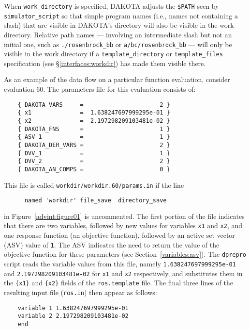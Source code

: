 When \texttt{work\_directory} is specified, DAKOTA adjusts the \texttt{\$PATH} seen
by \texttt{simulator\_script} so that simple program names
(i.e., names not containing a slash) that
are visible in DAKOTA's directory will also be visible in the work directory.
Relative path names ---
involving an intermediate slash but not an initial one,
such as \texttt{./rosenbrock\_bb} or \texttt{a/bc/rosenbrock\_bb} ---
will only be visible in the work directory if a \texttt{template\_directory}
or \texttt{template\_files} specification (see \S\ref{interfaces:workdir})
has made them visible there.

As an example of the data flow on a particular function evaluation,
consider evaluation 60. The parameters file for this evaluation consists of:
\begin{small}
\begin{verbatim}
    { DAKOTA_VARS     =                      2 }
    { x1              =  1.638247697999295e-01 }
    { x2              =  2.197298209103481e-02 }
    { DAKOTA_FNS      =                      1 }
    { ASV_1           =                      1 }
    { DAKOTA_DER_VARS =                      2 }
    { DVV_1           =                      1 }
    { DVV_2           =                      2 }
    { DAKOTA_AN_COMPS =                      0 }
\end{verbatim}
\end{small}

This file is called \texttt{workdir/workdir.60/params.in} if the line
\begin{small}
\begin{verbatim}
 	  named 'workdir' file_save  directory_save
\end{verbatim}
\end{small}
in Figure~\ref{advint:figure01} is uncommented.
The first portion of the file indicates that there are two variables,
followed by new values for variables \texttt{x1} and \texttt{x2}, and
one response function (an objective function), followed by an active
set vector (ASV) value of \texttt{1}. The ASV indicates the need to
return the value of the objective function for these parameters (see
Section~\ref{variables:asv}).  The \texttt{dprepro} script reads the
variable values from this file, namely \texttt{1.638247697999295e-01}
and \texttt{2.197298209103481e-02} for \texttt{x1} and \texttt{x2}
respectively, and substitutes them in the \texttt{\{x1\}} and
\texttt{\{x2\}} fields of the \texttt{ros.template} file. The final
three lines of the resulting input file (\texttt{ros.in}) then appear
as follows:
\begin{small}
\begin{verbatim}
    variable 1 1.638247697999295e-01
    variable 2 2.197298209103481e-02
    end
\end{verbatim}
\end{small}

